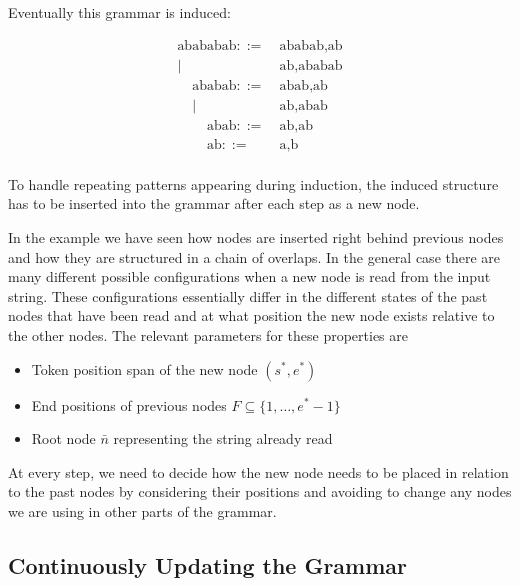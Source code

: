 \bigbreak%
Eventually this grammar is induced:\par
\begin{multicols}{3}
    \ttfamily
    \noindent
    \begin{align*}
        \text{abababab} ::= &\ \text{ababab,ab}\\
                            |&\ \text{ab,ababab}
    \end{align*}
    \begin{align*}
        \text{ababab} ::= &\ \text{abab,ab}\\
                |&\ \text{ab,abab}
    \end{align*}
    \begin{align*}
        \text{abab} ::= &\ \text{ab,ab}\\
        \text{ab} ::= &\ \text{a,b}\\
    \end{align*}
\end{multicols}

To handle repeating patterns appearing during induction, the induced structure has to be inserted into the grammar after each step as a new node.
\bigbreak%

In the example we have seen how nodes are inserted right behind previous nodes and how they are structured in a chain of overlaps. In the general case there are many different possible configurations when a new node is read from the input string. These configurations essentially differ in the different states of the past nodes that have been read and at what position the new node exists relative to the other nodes. The relevant parameters for these properties are
\begin{itemize}
\item Token position span of the new node $(s^*, e^*)$
\item End positions of previous nodes $F \subseteq \{1, \ldots, e^*-1\}$
\item Root node $\bar{n}$ representing the string already read
\end{itemize}

At every step, we need to decide how the new node needs to be placed in relation to the past nodes by considering their positions and avoiding to change any nodes we are using in other parts of the grammar.

\subsection{Continuously Updating the Grammar}


